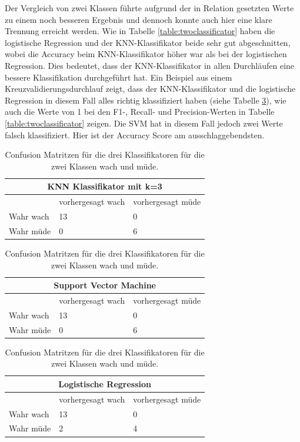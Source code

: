 Der Vergleich von zwei Klassen führte aufgrund der in Relation gesetzten Werte zu einem noch besseren Ergebnis und dennoch konnte auch hier eine klare Trennung erreicht werden. Wie in Tabelle \ref{table:twoclassificator} haben die logistische Regression und der KNN-Klassifikator beide sehr gut abgeschnitten, wobei die Accuracy beim KNN-Klassifikator höher war als bei der logistischen Regression. Dies bedeutet, dass der KNN-Klassifikator in allen Durchläufen eine bessere Klassifikation durchgeführt hat. Ein Beispiel aus einem Kreuzvalidierungsdurchlauf zeigt, dass der KNN-Klassifikator und die logistische Regression in diesem Fall alles richtig klassifiziert haben (siehe Tabelle \ref{table:confusionmatrixtwoclasses}), wie auch die Werte von 1 bei den F1-, Recall- und Precision-Werten in Tabelle \ref{table:twoclassificator} zeigen. Die SVM hat in diesem Fall jedoch zwei Werte falsch klassifiziert. Hier ist der Accuracy Score am ausschlaggebendsten.


\begin{table}
    \centering
    \begin{tabular}{|l|l|l|}
    \hline
    \multicolumn{3}{|c|}{KNN Klassifikator mit k=3} \\ \hline
    & vorhergesagt wach & vorhergesagt müde \\ \hline
    Wahr wach & 13 & 0 \\ \hline
    Wahr müde & 0 & 6 \\ \hline
    \end{tabular}
    
    \vspace{0.5cm} %
    
    \begin{tabular}{|l|l|l|}
    \hline
    \multicolumn{3}{|c|}{Support Vector Machine} \\ \hline
    & vorhergesagt wach & vorhergesagt müde \\ \hline
    Wahr wach & 13 & 0 \\ \hline
    Wahr müde & 0 & 6 \\ \hline
    \end{tabular}
    
    \vspace{0.5cm} %
    
    \begin{tabular}{|l|l|l|}
    \hline
    \multicolumn{3}{|c|}{Logistische Regression} \\ \hline
    & vorhergesagt wach & vorhergesagt müde \\ \hline
    Wahr wach & 13 & 0 \\ \hline
    Wahr müde & 2 & 4 \\ \hline
    \end{tabular}
\caption{Confusion Matritzen für die drei Klassifikatoren für die zwei Klassen wach und müde.}
\label{table:confusionmatrixtwoclasses}
\end{table}

